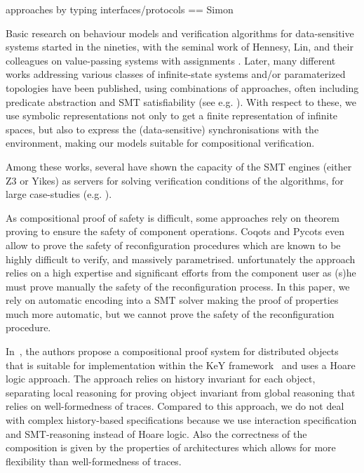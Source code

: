 \documentclass{llncs}
\begin{document}

approaches by typing interfaces/protocols == Simon


Basic research on behaviour models and verification algorithms for
data-sensitive systems started in the nineties, with the seminal work
of Hennesy, Lin, and their colleagues on value-passing systems with
assignments
\cite{CONCUR::Lin1996,HennessyL1995:353,APSEC::Lin2001}. Later, many
different works addressing various classes of infinite-state systems
and/or paramaterized topologies have been published, using
combinations of approaches, often including predicate abstraction and
SMT satisfiability (see
e.g. \cite{BruniEtAl-Tiles-Concur2000,DBLP:conf/cade/GhilardiNRZ08,DBLP:journals/jsat/AlbertiGPRR12,CimattiEtAl-NUXMV-CAV2014,ChampionEtAl-Kind2-CAV2016}). With
respect to these, we use symbolic representations not only to get a
finite representation of infinite spaces, but also to express the
(data-sensitive) synchronisations with the environment, making our
models suitable for compositional verification.

Among these works, several have shown the capacity of the SMT engines
(either Z3 or Yikes) as servers for solving verification conditions of
the algorithms, for large case-studies
(e.g. \cite{DBLP:journals/corr/CimattiGMT13,DBLP:journals/corr/abs-1806-11459}).

As compositional proof of safety is difficult, some approaches rely on theorem proving to ensure the safety of component operations. Coqots and Pycots\cite{BCDLM:CBSE2014} even allow to prove the safety of reconfiguration procedures which are known to be highly difficult to verify, and massively parametrised. unfortunately the approach relies on a high expertise and significant efforts from the component user as (s)he must prove manually the safety of the reconfiguration process. In this paper, we rely on automatic encoding into a SMT solver making the proof of properties much more automatic, but we cannot prove the safety of the reconfiguration procedure.




In~\cite{DDJO:JLAMP2012}, the authors propose a compositional proof system for distributed objects that is suitable for implementation within the KeY framework~\cite{BHS:Key2007} and uses a Hoare logic approach.
The approach relies on history invariant for each object, separating local reasoning for proving object invariant from global reasoning that relies on well-formedness of traces. Compared to this  approach, we do not  deal with complex history-based specifications because we use interaction specification and SMT-reasoning instead of Hoare logic. Also the correctness of the composition is given by the properties of architectures which allows for more flexibility than well-formedness of traces.
\end{document}
